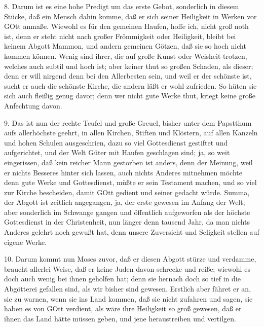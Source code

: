 8. Darum ist es eine hohe Predigt um das erste Gebot, sonderlich in diesem Stücke, daß ein Mensch dahin komme, daß er sich seiner Heiligkeit in Werken vor GOtt anmaße. Wiewohl es für den gemeinen Haufen, hoffe ich, nicht groß noth ist, denn er steht nicht nach großer Frömmigkeit oder Heiligkeit, bleibt bei keinem Abgott Mammon, und andern gemeinen Götzen, daß sie so hoch nicht kommen können. Wenig sind ihrer, die auf große Kunst oder Weisheit trotzen, welches auch subtil und hoch ist; aber keiner thut so großen Schaden, als dieser; denn er will nirgend denn bei den Allerbesten sein, und weil er der schönste ist, sucht er auch die schönste Kirche, die andern läßt er wohl zufrieden. So hüten sie sich auch fleißig genug davor; denn wer nicht gute Werke thut, kriegt keine große Anfechtung davon.

9. Das ist nun der rechte Teufel und große Greuel, bisher unter dem Papstthum aufs allerhöchste geehrt, in allen Kirchen, Stiften und Klöstern, auf allen Kanzeln und hohen Schulen ausgeschrien, dazu so viel Gottesdienst gestiftet und aufgerichtet, und der Welt Güter mit Haufen geschlagen sind; ja, so weit eingerissen, daß kein reicher Mann gestorben ist anders, denn der Meinung, weil er nichts Besseres hinter sich lassen, auch nichts Anderes mitnehmen möchte denn gute Werke und Gottesdienst, müßte er sein Testament machen, und so viel zur Kirche bescheiden, damit GOtt gedient und seiner gedacht würde. Summa, der Abgott ist zeitlich angegangen, ja, der erste gewesen im Anfang der Welt; aber sonderlich im Schwange gangen und öffentlich aufgeworfen als der höchste Gottesdienst in der Christenheit, nun länger denn tausend Jahr, da man nichts Anderes gelehrt noch gewußt hat, denn unsere Zuversicht und Seligkeit stellen auf eigene Werke.

10. Darum kommt nun Moses zuvor, daß er diesen Abgott stürze und verdamme, braucht allerlei Weise, daß er keine Juden davon schrecke und reiße; wiewohl es doch auch wenig bei ihnen geholfen hat; denn sie hernach doch so tief in die Abgötterei gefallen sind, als wir bisher sind gewesen. Erstlich aber fähret er an, sie zu warnen, wenn sie ins Land kommen, daß sie nicht zufahren und sagen, sie haben es von GOtt verdient, als wäre ihre Heiligkeit so groß gewesen, daß er ihnen das Land hätte müssen geben, und jene heraustreiben und vertilgen.

